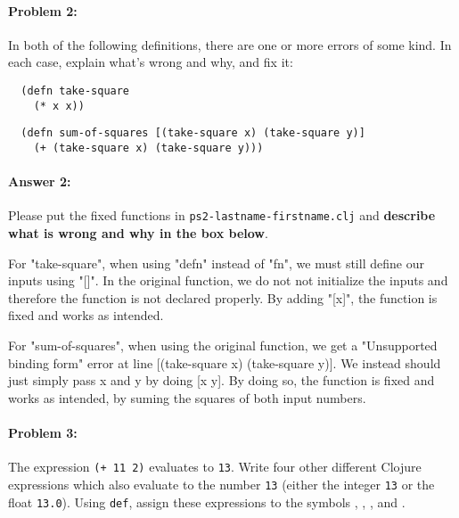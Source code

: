 \documentclass[10pt]{article}
\newenvironment{AnswerBox}{\begin{mdframed}[style=simple]}{\end{mdframed}}
\newcommand{\required}[1]{{\color{blue}{#1}}}
\newcommand{\PSnum}{2}
\begin{document}
\noindent\hrulefill %

\paragraph{Problem 2:} In both of the following definitions, there are one or
more errors of some kind. In each case, explain what's wrong and why, and fix
it:

\begin{lstlisting}
  (defn take-square
    (* x x))
\end{lstlisting}

\begin{lstlisting}
  (defn sum-of-squares [(take-square x) (take-square y)]
    (+ (take-square x) (take-square y)))
\end{lstlisting}

\paragraph{Answer 2:} Please put the fixed functions in
\texttt{ps\PSnum-lastname-firstname.clj} and \textbf{describe what is wrong and
why in the box below}.

\begin{AnswerBox}%
For "take-square", when using "defn" instead of "fn", we must still define our inputs using "[]". In the original function, we do not not initialize the inputs and therefore the function is not declared properly. By adding "[x]", the function is fixed and works as intended.

  
For "sum-of-squares", when using the original function, we get a "Unsupported binding form" error at line [(take-square x) (take-square y)]. We instead should just simply pass x and y by doing [x y]. By doing so, the function is fixed and works as intended, by suming the squares of both input numbers.
\end{AnswerBox}%

\noindent\hrulefill %

\paragraph{Problem 3:}
The expression \texttt{(+ 11 2)}  evaluates to \texttt{13}. Write four
other different Clojure expressions which also evaluate to the number
\texttt{13} (either the integer \texttt{13} or the float \texttt{13.0}). Using
\texttt{def}, assign these expressions to the symbols
\required{\texttt{exp-13-1}},
\required{\texttt{exp-13-2}},
\required{\texttt{exp-13-3}}, and
\required{\texttt{exp-13-4}}.
\end{document}
